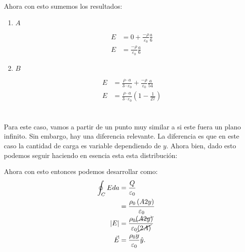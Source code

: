 \documentclass{report}
\begin{document}
Ahora con esto sumemos los resultados:
\begin{enumerate}
  \item $A$

    \begin{align*}
      E &= 0 + \frac{-\rho}{\varepsilon_0} \frac{a}{6}\\
      E &= \frac{-\rho}{\varepsilon_0} \frac{a}{6}
    \end{align*}
  \item $B$

    \begin{align*}
      E &= \frac{\rho \cdot a}{3 \cdot \varepsilon_0} + \frac{-\rho}{\varepsilon_0} \frac{a}{54} \\
      E &= \frac{\rho \cdot a}{3 \cdot \varepsilon_0}\left( 1 - \frac{1}{27} \right)
    \end{align*}
\end{enumerate}

\chapter{}

Para este caso, vamos a partir de un punto muy similar a si este fuera un plano infinito. Sin embargo, hay una diferencia relevante. La diferencia es que en este caso la cantidad de carga es  variable dependiendo de $y$. Ahora bien, dado esto podemos seguir haciendo en esencia esta esta distribución:



Ahora con esto entonces podemos desarrollar como:
\begin{align*}
  \oint_{C} E da &= \frac{Q}{\varepsilon_0} \\ 
  &= \frac{\rho_0 \left( A 2y \right) }{\varepsilon_0} \\
  \left| E \right| &= \frac{\rho_0 \cancel{\left( A 2y \right) }}{\varepsilon_0 \cancel{\left( 2A \right) }} \\
  \vec{E} &= \frac{\rho_0 y}{\varepsilon_0} \hat{y}
.\end{align*}
\end{document}

